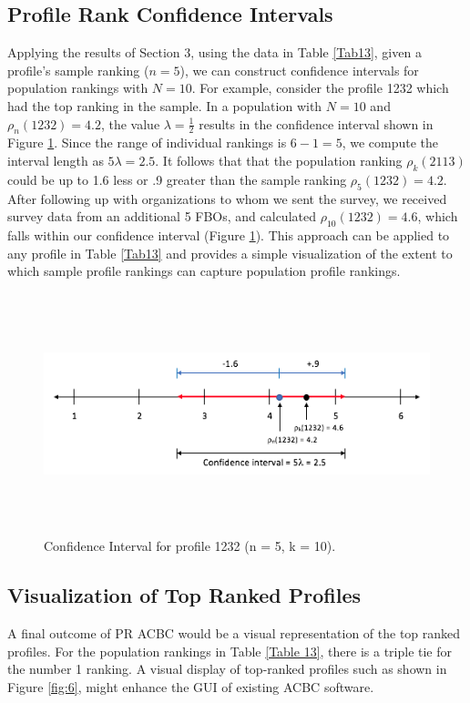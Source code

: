 \documentclass[a4paper, 12pt]{article}
\begin{document}
\subsection{Profile Rank Confidence Intervals}

Applying the results of Section 3, using the data in Table \ref{Tab13}, given a profile's sample ranking ($n=5$), we can construct confidence intervals for  population rankings with $N=10$. For example, consider the  profile 1232 which had the top ranking in the sample.  In a population with $N=10$ and $\rho_n(1232)=4.2$, the value $\lambda=\frac{1}{2}$ results in the confidence interval shown in Figure \ref{fig:4}. Since the range of individual rankings is $6-1=5$, we compute the interval length as $5\lambda = 2.5$. It follows that that the population ranking $\rho_k(2113)$ could be up to 1.6 less or .9 greater than the sample ranking $\rho_5(1232)=4.2$. After following up with organizations to whom we sent the survey, we received survey data from an additional 5 FBOs, and calculated $\rho_{10}(1232)=4.6$, which falls within our confidence interval (Figure \ref{fig:4}). This approach can be applied to any profile in Table \ref{Tab13} and provides a simple visualization  of the extent to which sample profile rankings can capture population profile rankings. 


\begin{figure}[!htpb]
\centering
\includegraphics[width=5.75in, height=2.75in]{Confidence_Interval_2.png}
\caption{Confidence Interval for profile 1232 (n = 5, k = 10).}
\label{fig:4}
\end{figure}

\subsection{Visualization of Top Ranked Profiles}
A final outcome of PR ACBC would be a visual representation of the top ranked profiles. For the population rankings in Table \ref{Table 13}, there is a triple tie for the number 1 ranking.  A visual display of top-ranked profiles such as shown in Figure \ref{fig:6}, might enhance the GUI of existing ACBC software.
\end{document}
